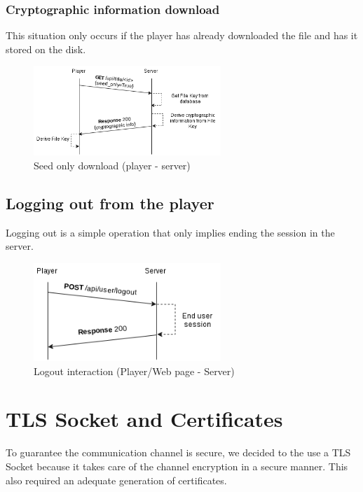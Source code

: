\documentclass[11pt,a4paper]{report}
\begin{document}
\subsection{Cryptographic information download}
This situation only occurs if the player has already downloaded the file and has it stored on the disk.

\begin{figure}[H]
\centerline{\includegraphics[width=200pt]{images/seedOnlyDown.png}}
\caption{Seed only download (player - server)}
\label{player}
\end{figure}

\section{Logging out from the player}
Logging out is a simple operation that only implies ending the session in the server.

\begin{figure}[H]
\centerline{\includegraphics[width=200pt]{images/logout.png}}
\caption{Logout interaction (Player/Web page - Server)}
\label{player}
\end{figure}

\chapter{TLS Socket and Certificates}
\label{sec:certs}
To guarantee the communication channel is secure, we decided to the use a TLS Socket because it takes care of the channel encryption in a secure manner. This also required an adequate generation of certificates.\\
\end{document}

